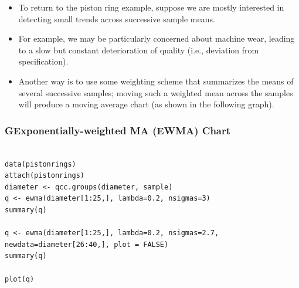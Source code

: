 \documentclass[]{article}
\begin{document}
\begin{itemize}
\item To return to the piston ring example, suppose we are mostly interested in detecting small trends across successive sample means. 
\item For example, we may be particularly concerned about machine wear, leading to a slow but constant deterioration of quality (i.e., deviation from specification). 

\item Another way is to use some weighting scheme that summarizes the means of several successive samples; moving such a weighted mean across the samples will produce a moving average chart (as shown in the following graph).
\end{itemize}
%
%
%
\newpage
\subsubsection{GExponentially-weighted MA (EWMA) Chart}
\begin{framed}
\begin{verbatim}

data(pistonrings)
attach(pistonrings)
diameter <- qcc.groups(diameter, sample)
q <- ewma(diameter[1:25,], lambda=0.2, nsigmas=3)
summary(q)

q <- ewma(diameter[1:25,], lambda=0.2, nsigmas=2.7,
newdata=diameter[26:40,], plot = FALSE)
summary(q)

plot(q)
\end{verbatim}
\end{framed}
\end{document}
